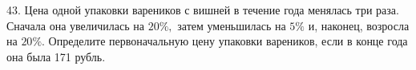 43. Цена одной упаковки вареников с вишней в течение года менялась три раза. Сначала она увеличилась на $20\%,$ затем уменьшилась на $5\%$ и, наконец, возросла на $20\%.$ Определите первоначальную цену упаковки вареников, если в конце года она была 171 рубль.\\
